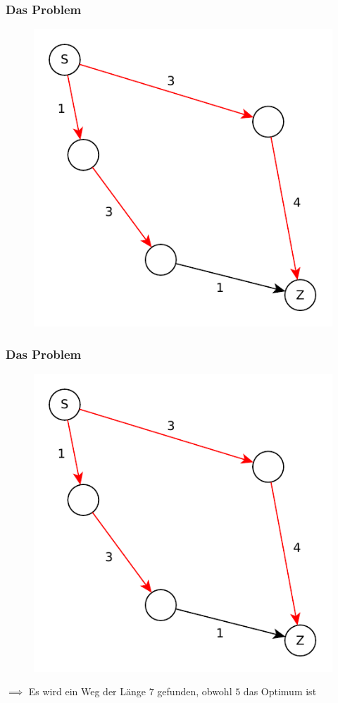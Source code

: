 \begin{frame}
\frametitle{Das Problem}
\begin{figure}
\includegraphics[scale=.8]{dijkstra_graphs/bfs_fail_4.pdf}
\end{figure}
\end{frame}

\begin{frame}
\frametitle{Das Problem}
\begin{figure}
\includegraphics[scale=.8]{dijkstra_graphs/bfs_fail_4.pdf}
\end{figure}

$\implies$ Es wird ein Weg der Länge $7$ gefunden, obwohl $5$ das Optimum ist

\end{frame}


